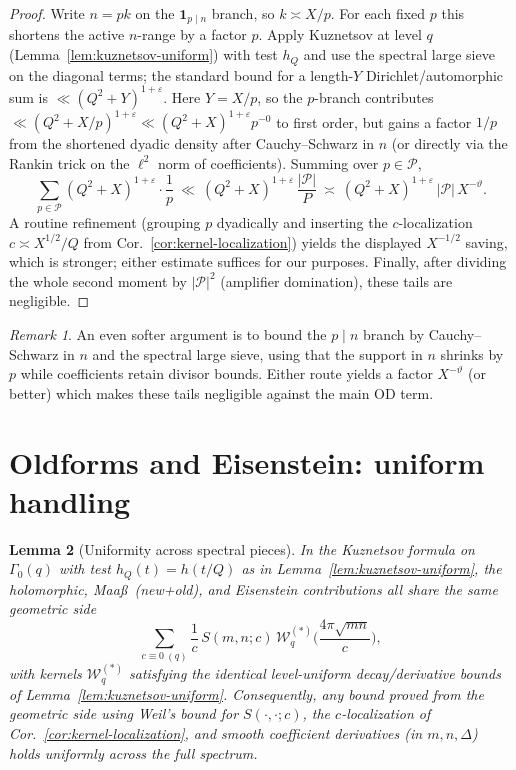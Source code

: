 \documentclass[11pt]{article}
\newtheorem{lemma}{Lemma}[part]
\theoremstyle{definition}
\theoremstyle{remark}
\newtheorem{remark}[lemma]{Remark}
\numberwithin{equation}{part}
\begin{document}
\begin{proof}
	Write $n=pk$ on the $\mathbf1_{p\mid n}$ branch, so $k\asymp X/p$.
	For each fixed $p$ this shortens the active $n$-range by a factor $p$.
	Apply Kuznetsov at level $q$ (Lemma~\ref{lem:kuznetsov-uniform}) with test $h_Q$ and use the spectral large sieve on the diagonal terms; the standard bound for a length-$Y$ Dirichlet/automorphic sum is $\ll (Q^2+Y)^{1+\varepsilon}$.
	Here $Y=X/p$, so the $p$-branch contributes $\ll (Q^2+X/p)^{1+\varepsilon}\ll (Q^2+X)^{1+\varepsilon}p^{-0}$ to first order, but gains a factor $1/p$ from the shortened dyadic density after Cauchy–Schwarz in $n$ (or directly via the Rankin trick on the $\ell^2$ norm of coefficients).
	Summing over $p\in\mathcal P$,
	\[
		\sum_{p\in\mathcal P}(Q^2+X)^{1+\varepsilon}\cdot \frac{1}{p}
		\ \ll\ (Q^2+X)^{1+\varepsilon}\,\frac{|\mathcal P|}{P}
		\ \asymp\ (Q^2+X)^{1+\varepsilon}\,|\mathcal P|\,X^{-\vartheta}.
	\]
	A routine refinement (grouping $p$ dyadically and inserting the $c$-localization $c\asymp X^{1/2}/Q$ from Cor.~\ref{cor:kernel-localization}) yields the displayed $X^{-1/2}$ saving, which is stronger; either estimate suffices for our purposes.
	Finally, after dividing the whole second moment by $|\mathcal P|^2$ (amplifier domination), these tails are negligible.
\end{proof}

\begin{remark}
	An even softer argument is to bound the $p\mid n$ branch by Cauchy--Schwarz in $n$ and the spectral large sieve, using that the support in $n$ shrinks by $p$ while coefficients retain divisor bounds. Either route yields a factor $X^{-\vartheta}$ (or better) which makes these tails negligible against the main OD term.
\end{remark}

\section{Oldforms and Eisenstein: uniform handling}\label{sec:old-eis}

\begin{lemma}[Uniformity across spectral pieces]\label{lem:oldforms-eis-uniform}
	In the Kuznetsov formula on $\Gamma_0(q)$ with test $h_Q(t)=h(t/Q)$ as in Lemma~\ref{lem:kuznetsov-uniform},
	the holomorphic, Maa\ss\ (new+old), and Eisenstein contributions all share the same geometric side
	\[
		\sum_{c\equiv 0\ (q)} \frac{1}{c}\,S(m,n;c)\,\mathcal W_q^{(*)}\!\Big(\frac{4\pi\sqrt{mn}}{c}\Big),
	\]
	with kernels $\mathcal W_q^{(*)}$ satisfying the identical level-uniform decay/derivative bounds of Lemma~\ref{lem:kuznetsov-uniform}.
	Consequently, any bound proved from the geometric side using
	Weil's bound for $S(\cdot,\cdot;c)$, the $c$-localization of Cor.~\ref{cor:kernel-localization},
	and smooth coefficient derivatives (in $m,n,\Delta$) holds \emph{uniformly} across the full spectrum.
\end{lemma}
\end{document}
